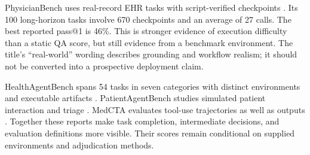 PhysicianBench uses real-record EHR tasks with script-verified checkpoints \cite{physicianbench2026}. Its 100 long-horizon tasks involve 670 checkpoints and an average of 27 calls. The best reported pass@1 is 46\%. This is stronger evidence of execution difficulty than a static QA score, but still evidence from a benchmark environment. The title's ``real-world'' wording describes grounding and workflow realism; it should not be converted into a prospective deployment claim.

HealthAgentBench spans 54 tasks in seven categories with distinct environments and executable artifacts \cite{healthagentbench2026}. PatientAgentBench studies simulated patient interaction and triage \cite{patientagentbench2026}. MedCTA evaluates tool-use trajectories as well as outputs \cite{medcta2026}. Together these reports make task completion, intermediate decisions, and evaluation definitions more visible. Their scores remain conditional on supplied environments and adjudication methods.

